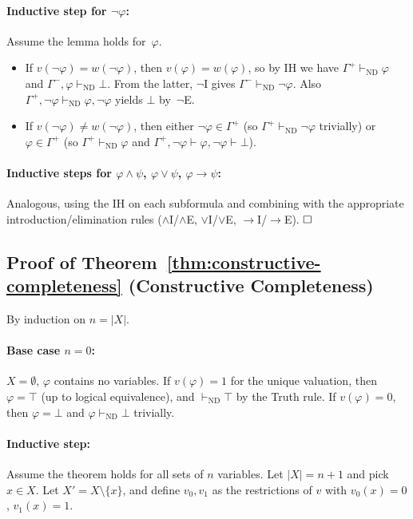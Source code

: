 \documentclass[acmtocl,review,anonymous]{acmart}
\newcommand{\proves}{\vdash}
\begin{document}
\paragraph{Inductive step for $\neg\varphi$:}
Assume the lemma holds for~$\varphi$.
\begin{itemize}
  \item If $v(\neg\varphi) = w(\neg\varphi)$, then
    $v(\varphi) = w(\varphi)$, so by IH we have
    $\Gamma^+ \proves_{\mathrm{ND}} \varphi$ and
    $\Gamma^-, \varphi \proves_{\mathrm{ND}} \bot$.
    From the latter, $\neg$I gives
    $\Gamma^- \proves_{\mathrm{ND}} \neg\varphi$.
    Also $\Gamma^+, \neg\varphi \proves_{\mathrm{ND}} \varphi, \neg\varphi$
    yields $\bot$ by~$\neg$E.

  \item If $v(\neg\varphi) \neq w(\neg\varphi)$, then either
    $\neg\varphi \in \Gamma^+$ (so $\Gamma^+ \proves_{\mathrm{ND}} \neg\varphi$
    trivially) or $\varphi \in \Gamma^+$ (so
    $\Gamma^+ \proves_{\mathrm{ND}} \varphi$ and
    $\Gamma^+, \neg\varphi \vdash \varphi, \neg\varphi \vdash \bot$).
\end{itemize}

\paragraph{Inductive steps for $\varphi \wedge \psi$,
  $\varphi \vee \psi$, $\varphi \to \psi$:}
Analogous, using the IH on each subformula and combining with the
appropriate introduction/elimination rules ($\wedge$I/$\wedge$E,
$\vee$I/$\vee$E, $\to$I/$\to$E).  $\hfill\square$

\subsection{Proof of Theorem~\ref{thm:constructive-completeness}
  (Constructive Completeness)}

By induction on $n = |X|$.

\paragraph{Base case $n=0$:} $X = \emptyset$, $\varphi$ contains no
variables.  If $v(\varphi)=1$ for the unique valuation, then
$\varphi = \top$ (up to logical equivalence), and
$\proves_{\mathrm{ND}} \top$ by the Truth rule.
If $v(\varphi)=0$, then $\varphi = \bot$ and
$\varphi \proves_{\mathrm{ND}} \bot$ trivially.

\paragraph{Inductive step:} Assume the theorem holds for all sets of
$n$ variables.  Let $|X| = n+1$ and pick $x \in X$.
Let $X' = X \setminus \{x\}$, and define
$v_0, v_1$ as the restrictions of $v$ with $v_0(x)=0$, $v_1(x)=1$.
\end{document}
